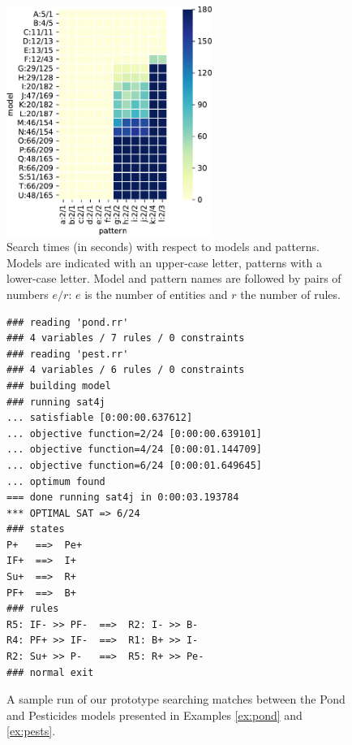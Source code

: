 \documentclass[a4paper,twoside]{article}
\begin{document}
\begin{figure}[t!]
  \begin{center}
    \includegraphics[width=0.6\textwidth]{heatmap}
  \end{center}
  \caption{Search times (in seconds) with respect to models and patterns. Models are indicated with an upper-case letter,  patterns with a lower-case letter.
 Model and pattern names are followed by pairs of numbers $e/r$: $e$ is the number of entities and $r$ the number of rules.}
  \label{fig:heatmap}
\end{figure}

\begin{figure}[t]
\begin{small}
\begin{verbatim}
### reading 'pond.rr'
### 4 variables / 7 rules / 0 constraints
### reading 'pest.rr'
### 4 variables / 6 rules / 0 constraints
### building model
### running sat4j
... satisfiable [0:00:00.637612]
... objective function=2/24 [0:00:00.639101]
... objective function=4/24 [0:00:01.144709]
... objective function=6/24 [0:00:01.649645]
... optimum found
=== done running sat4j in 0:00:03.193784
*** OPTIMAL SAT => 6/24
### states
P+   ==>  Pe+
IF+  ==>  I+
Su+  ==>  R+
PF+  ==>  B+
### rules
R5: IF- >> PF-  ==>  R2: I- >> B-
R4: PF+ >> IF-  ==>  R1: B+ >> I-
R2: Su+ >> P-   ==>  R5: R+ >> Pe-
### normal exit
\end{verbatim}
\end{small}
\caption{A sample run of our prototype searching matches between the Pond and Pesticides models presented in Examples \ref{ex:pond} and \ref{ex:pests}.}
\label{fig:run}
\end{figure}
\end{document}
